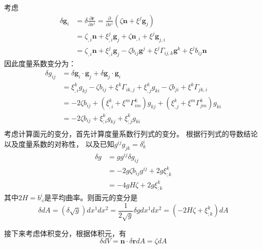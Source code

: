 \documentclass[UTF8,zihao=5]{ctexart}
\newcommand*{\pd}[2]{\frac{\partial #1}{\partial #2}}
\begin{document}
考虑
$$
    \begin{aligned}
        \delta\bm{g}_i
         & =\delta\pd{\bm{r}}{x^i}
        =\pd{}{x^i}(\zeta \bm{n} + \xi^j \bm{g}_j) \\
         & =\zeta_{,i}\bm{n} + \xi^j_{,i}\bm{g}_j
        + \zeta \bm{n}_{,i} + \xi^j \bm{g}_{j,i}   \\
         & =\zeta_{,i}\bm{n} + \xi^j_{,i}\bm{g}_j
        -\zeta b_{ij}\bm{g}^j +
        \xi^j \Gamma_{ij,k}\bm{g}^k + \xi^j b_{ij}\bm{n}
    \end{aligned}
$$
因此度量系数变分为：
$$
    \begin{aligned}
        \delta g_{ij}
         & = \delta\bm{g}_i\cdot\bm{g}_j + \delta\bm{g}_j\cdot\bm{g}_i \\
         & = \xi^k_{,i}g_{kj}
        -\zeta b_{ij} +
        \xi^k \Gamma_{ik,j} +
        \xi^k_{,j}g_{ki}
        -\zeta b_{ji} +
        \xi^k \Gamma_{jk,i}                                            \\
         & = -2\zeta b_{ij}
        + (\xi^k_{,i}+ \xi^m \Gamma_{im}^k)g_{kj}
        + (\xi^k_{,j}+ \xi^m \Gamma_{jm}^k)g_{ki}                      \\
         & =
        -2\zeta b_{ij}
        + \xi^k_{;i}g_{kj}
        + \xi^k_{;j}g_{ki}                                             \\
    \end{aligned}
$$
考虑计算面元的变分，首先计算度量系数行列式的变分。
根据行列式的导数结论以及度量系数的对称性，
以及已知$g^{ij}g_{jk}=\delta^i_k$
$$
    \begin{aligned}
        \delta g & =
        g g^{ij}\delta g_{ij}                \\
                 & =
        -2g\zeta b_{ij}g^{ij} + 2g\xi^k_{;k} \\
                 & =
        -4gH\zeta + 2g\xi^k_{;k}
    \end{aligned}
$$
其中$2H=b^i_{\cdot i}$是平均曲率。则面元的变分是
$$
    \delta dA = (\delta\sqrt{g})dx^1dx^2
    =\frac{1}{2\sqrt{g}}\delta g dx^1dx^2=
    (-2H\zeta + \xi^k_{;k})dA
$$

接下来考虑体积变分，根据体积元，有
$$
    \delta dV  = \bm{n}\cdot \delta \bm{r} dA =  \zeta dA
$$
\end{document}
